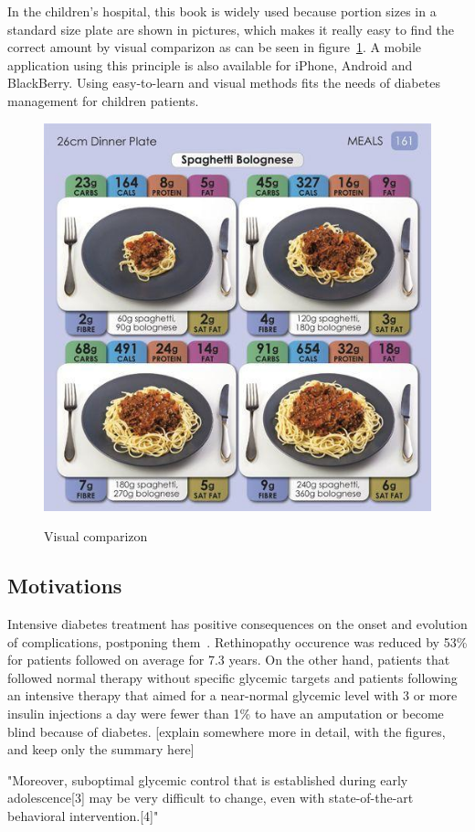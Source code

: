In the children's hospital, this book is widely used because portion sizes in a standard size plate are shown in pictures, which makes it really easy to find the correct amount by visual comparizon as can be seen in figure~\ref{fig:bookImage}. A mobile application using this principle is also available for iPhone, Android and BlackBerry. Using easy-to-learn and visual methods fits the needs of diabetes management for children patients.
\begin{figure}[h]
  \centering
  \caption{Visual comparizon}
  \includegraphics[scale=1.2]{bookImage.jpg}
  \label{fig:bookImage}
\end{figure}

\subsection{Motivations}

Intensive diabetes treatment has positive consequences on the onset and evolution of complications, postponing them~\cite{dcct1994effect}. Rethinopathy occurence was reduced by 53\% for patients followed on average for 7.3 years. On the other hand, patients that followed normal therapy without specific glycemic targets and patients following an intensive therapy that aimed for a near-normal glycemic level with 3 or more insulin injections a day were fewer than 1\% to have an amputation or become blind because of diabetes. [explain somewhere more in detail, with the figures, and keep only the summary here]

"Moreover, suboptimal glycemic control that is established during early adolescence[3] may be very difficult to change, even with state-of-the-art behavioral intervention.[4]"

